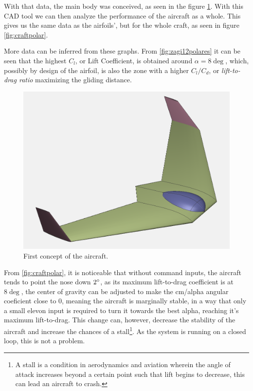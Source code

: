 With that data, the main body was conceived, as seen in the figure \ref{fig:preliminar}. With this CAD tool we can then analyze the performance of the aircraft as a whole. This gives us the same data as the airfoils', but for the whole craft, as seen in figure \ref{fig:craftpolar}.

More data can be inferred from these graphs. From \ref{fig:zagi12polares} it can be seen that the highest $C_l$, or Lift Coefficient, is obtained around $\alpha = 8\deg$, which, possibly by design of the airfoil, is also the zone with a higher $C_l/C_d$, or \textit{lift-to-drag ratio} maximizing the gliding distance. 

\begin{figure}
\centering
  \includegraphics[width=\linewidth]{figs/preliminar.png}
  \caption{First concept of the aircraft.}
  \label{fig:preliminar}
\end{figure}


From \ref{fig:craftpolar}, it is noticeable that without command inputs, the aircraft tends to point the nose down $ 2 \degree $, as its maximum lift-to-drag coefficient is at $8 \deg$, the center of gravity can be adjusted to make the cm/alpha angular coeficient close to 0, meaning the aircraft is marginally stable, in a way that only a small elevon input is required to turn it towards the best alpha, reaching it's maximum lift-to-drag. This change can, however, decrease the stability of the aircraft and increase the chances of a stall\footnote{A stall is a condition in aerodynamics and aviation wherein the angle of attack increases beyond a certain point such that lift begins to decrease, this can lead an aircraft to crash.}. As the system is running on a closed loop, this is not a problem.

